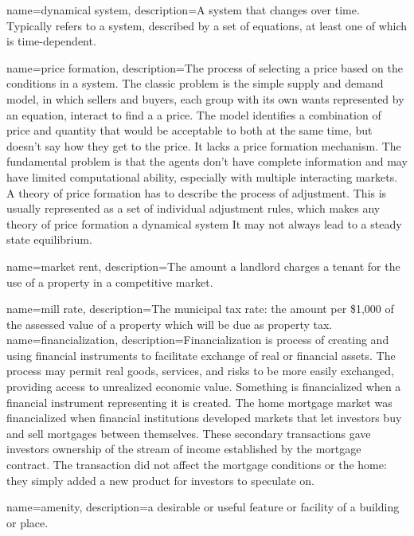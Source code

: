 {
name=dynamical system,
description={A system that changes over time. Typically refers to %
a system, described by a set of equations, at least one of which is time-dependent.}
}

{
name=price formation,
description={The process of selecting a price based on the conditions in a system. The classic problem is the simple supply and demand model, in which sellers and buyers, each group with its own wants represented by an equation, interact to find a a price. The model  identifies a combination of price and quantity that would be acceptable to both at the same time, but doesn't say how they get to the price. It lacks a price formation mechanism.  \newline The fundamental problem is that the agents don't have complete information and may have limited computational ability, especially with multiple interacting markets. A theory of price formation has to describe the process of adjustment. This is usually represented as a set of individual adjustment rules, which makes any theory of price formation a dynamical system It may not always lead to a steady state equilibrium.}
}


{
name=market rent,
description={The amount a landlord charges a tenant for the use of a property in a competitive market. }
}

{
name=mill rate,
description={The municipal tax rate: the amount per \$1,000 of the assessed value of a property which will be due as property tax.}
}
{}
{
name=financialization,
description={Financialization is process of creating and using  \glspl{financial instrument} to facilitate exchange of real or financial assets.  The process may permit real goods, services, and risks to be more easily exchanged, providing access to unrealized economic value. Something is financialized when a financial instrument representing it is created. The home mortgage market was financialized when financial institutions developed markets that let investors buy and sell mortgages between themselves. These secondary transactions gave investors ownership of the stream of income established by the mortgage contract. The transaction did not affect the mortgage conditions or the home: they simply added a new product for investors to speculate on. }
}

{
name=amenity,
description={a desirable or useful feature or facility of a building or place.}
}

